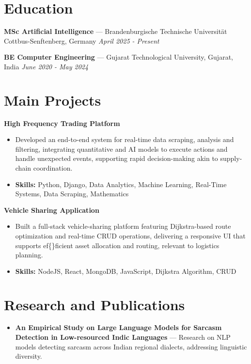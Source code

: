 \documentclass[a4paper,10pt]{article}
\begin{document}
\section*{Education}
\textbf{MSc Artificial Intelligence} — Brandenburgische Technische Universität Cottbus-Senftenberg, Germany \hfill \textit{April 2025 - Present}\par
\vspace{1.5pt}
\textbf{BE Computer Engineering} — Gujarat Technological University, Gujarat, India \hfill \textit{June 2020 - May 2024}\par

\section*{Main Projects}
\textbf{High Frequency Trading Platform}\par
\vspace{1pt}
\begin{itemize}
  \item Developed an end-to-end system for real-time data scraping, analysis and filtering, integrating quantitative and AI models to execute actions and handle unexpected events, supporting rapid decision-making akin to supply-chain coordination.
  \item \textbf{Skills:} Python, Django, Data Analytics, Machine Learning, Real-Time Systems, Data Scraping, Mathematics
\end{itemize}
\vspace{3pt}
\textbf{Vehicle Sharing Application}\par
\vspace{1pt}
\begin{itemize}
  \item Built a full-stack vehicle-sharing platform featuring Dijkstra-based route optimization and real-time CRUD operations, delivering a responsive UI that supports ef\{\}ficient asset allocation and routing, relevant to logistics planning.
  \item \textbf{Skills:} NodeJS, React, MongoDB, JavaScript, Dijkstra Algorithm, CRUD
\end{itemize}

\section*{Research and Publications}
\begin{itemize}
\item \textbf{An Empirical Study on Large Language Models for Sarcasm Detection in Low-resourced Indic Languages} — Research on NLP models detecting sarcasm across Indian regional dialects, addressing linguistic diversity.
\end{itemize}
\end{document}
